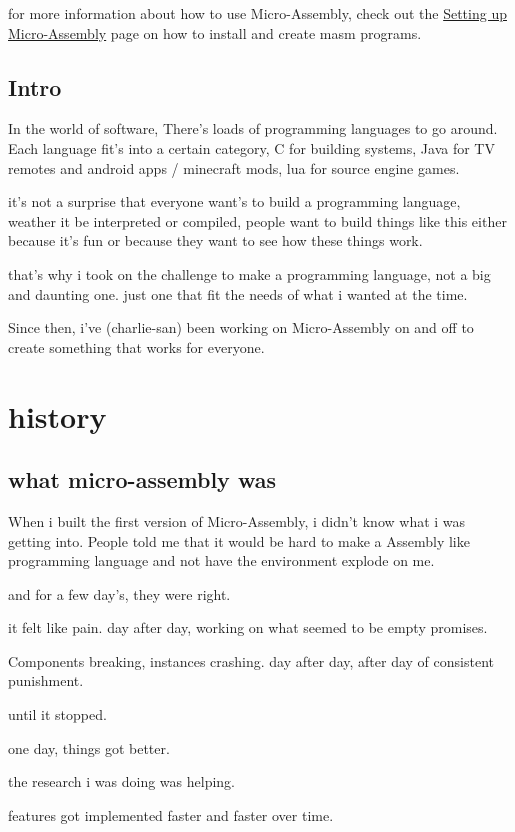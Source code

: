 \documentclass[a4paper,11pt]{book}
\begin{document}
for more information about how to use Micro-Assembly, check out the \hyperref[setup:masm]{Setting up Micro-Assembly} page on how to install and create masm programs.


\text 


\subsection{Intro}
In the world of software, There's loads of programming languages to go around.
Each language fit's into a certain category, C for building systems, Java for TV remotes and android apps / minecraft mods, lua for source engine games.

it's not a surprise that everyone want's to build a programming language, weather it be interpreted or compiled, people want to build things like this either because it's fun or because they want to see how these things work.

that's why i took on the challenge to make a programming language, not a big and daunting one. just one that fit the needs of what i wanted at the time.

Since then, i've (charlie-san) been working on Micro-Assembly on and off to create something that works for everyone.

\section{history}

\subsection{what micro-assembly was}
When i built the first version of Micro-Assembly, i didn't know what i was getting into.
People told me that it would be hard to make a Assembly like programming language and not have the environment explode on me.

and for a few day's, they were right.

it felt like pain.
day after day, working on what seemed to be empty promises.

Components breaking, instances crashing.
day after day, after day of consistent punishment.

until it stopped.

one day, things got better.

the research i was doing was helping.

features got implemented faster and faster over time.
\end{document}
